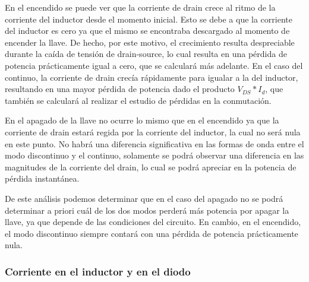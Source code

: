 \documentclass[e4_tp1_main.tex]{subfiles}
\begin{document}
	En el encendido se puede ver que la corriente de drain crece al ritmo de la corriente del inductor desde el momento inicial. Esto se debe a que la corriente del inductor es cero ya que el mismo se encontraba descargado al momento de encender la llave. De hecho, por este motivo, el crecimiento resulta despreciable durante la caída de tensión de drain-source, lo cual resulta en una pérdida de potencia prácticamente igual a cero, que se calculará más adelante. En el caso del continuo, la corriente de drain crecía rápidamente para igualar a la del inductor, resultando en una mayor pérdida de potencia dado el producto $V_{DS}*I_d$, que también se calculará al realizar el estudio de pérdidas en la conmutación.
	

	
	En el apagado de la llave no ocurre lo mismo que en el encendido ya que la corriente de drain estará regida por la corriente del inductor, la cual no será nula en este punto. No habrá una diferencia significativa en las formas de onda entre el modo discontinuo y el continuo, solamente se podrá observar una diferencia en las magnitudes de la corriente del drain, lo cual  se podrá apreciar en la potencia de pérdida instantánea. 
	
	De este análisis podemos determinar que en el caso del apagado no se podrá determinar a priori cuál de los dos modos perderá más potencia por apagar la llave, ya que depende de las condiciones del circuito. En cambio, en el encendido, el modo discontinuo siempre contará con una pérdida de potencia prácticamente nula.
	
	
	
	
	\subsubsection{Corriente en el inductor y en el diodo}
	
\end{document}

